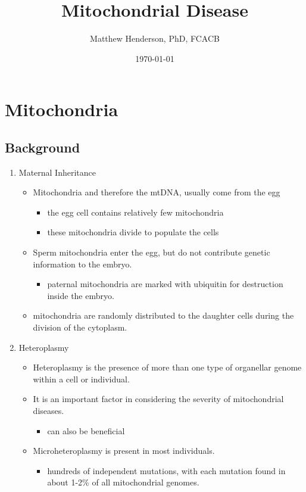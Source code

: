 \documentclass{scrartcl}
\author{Matthew Henderson, PhD, FCACB}
\date{\today}
\title{Mitochondrial Disease}
\begin{document}
\maketitle
\tableofcontents


\section{Mitochondria}
\label{sec:orgb17e392}
\subsection{Background}
\label{sec:org9270a7a}
\begin{enumerate}
\item Maternal Inheritance
\label{sec:org00beeb4}
\begin{itemize}
\item Mitochondria and therefore the mtDNA, usually come from the egg
\begin{itemize}
\item the egg cell contains relatively few mitochondria
\item these mitochondria divide to populate the cells
\end{itemize}
\item Sperm mitochondria enter the egg, but do not contribute genetic
information to the embryo.
\begin{itemize}
\item paternal mitochondria are marked with ubiquitin for destruction
inside the embryo.
\end{itemize}
\item mitochondria are randomly distributed to the daughter cells during
the division of the cytoplasm.
\end{itemize}

\item Heteroplasmy
\label{sec:orgb58e6d9}

\begin{itemize}
\item Heteroplasmy is the presence of more than one type of organellar
genome within a cell or individual.

\item It is an important factor in considering the severity of
mitochondrial diseases.
\begin{itemize}
\item can also be beneficial
\end{itemize}

\item Microheteroplasmy is present in most individuals.
\begin{itemize}
\item hundreds of independent mutations, with each mutation found in
about 1-2\% of all mitochondrial genomes.
\end{itemize}
\end{itemize}


\end{enumerate}
\end{document}
